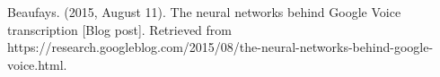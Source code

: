\documentclass[11pt, oneside]{article}
\begin{document}
\begin{thebibliography}{9}









  Beaufays. (2015, August 11). The neural networks behind Google Voice transcription [Blog post]. Retrieved from https://research.googleblog.com/2015/08/the-neural-networks-behind-google-voice.html.

\end{thebibliography}
\end{document}
